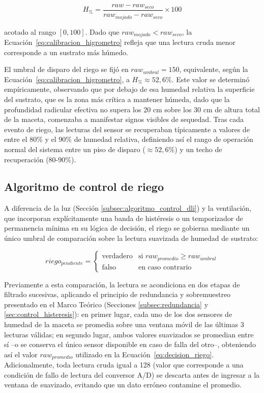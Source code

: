 \begin{equation}
    H_{\%} = \frac{raw - raw_{seco}}{raw_{mojado} - raw_{seco}} \times 100
    \label{eq:calibracion_higrometro}
\end{equation}

acotado al rango $[0, 100]$. Dado que $raw_{mojado} < raw_{seco}$, la Ecuación~\ref{eq:calibracion_higrometro} refleja que una lectura cruda menor corresponde a un sustrato más húmedo.

El umbral de disparo del riego se fijó en $raw_{umbral} = 150$, equivalente, según la Ecuación~\ref{eq:calibracion_higrometro}, a $H_{\%} \approx 52{,}6\%$. Este valor se determinó empíricamente, observando que por debajo de esa humedad relativa la superficie del sustrato, que es la zona más crítica a mantener húmeda, dado que la profundidad radicular efectiva no supera los 20 cm sobre los 30 cm de altura total de la maceta, comenzaba a manifestar signos visibles de sequedad. Tras cada evento de riego, las lecturas del sensor se recuperaban típicamente a valores de entre el 80\% y el 90\% de humedad relativa, definiendo así el rango de operación normal del sistema entre un piso de disparo ($\approx 52{,}6\%$) y un techo de recuperación ($80\text{-}90\%$).

\subsection{Algoritmo de control de riego}
\label{subsec:algoritmo_control_riego}

A diferencia de la luz (Sección \ref{subsec:algoritmo_control_dli}) y la ventilación, que incorporan explícitamente una banda de histéresis o un temporizador de permanencia mínima en su lógica de decisión, el riego se gobierna mediante un único umbral de comparación sobre la lectura suavizada de humedad de sustrato:

\begin{equation}
    riego_{pendiente} =
    \begin{cases}
        \text{verdadero} & \text{si } raw_{promedio} \geq raw_{umbral} \\
        \text{falso} & \text{en caso contrario}
    \end{cases}
    \label{eq:decision_riego}
\end{equation}

Previamente a esta comparación, la lectura se acondiciona en dos etapas de filtrado sucesivas, aplicando el principio de redundancia y sobremuestreo presentado en el Marco Teórico (Secciones \ref{subsec:redundancia} y \ref{sec:control_histeresis}): en primer lugar, cada uno de los dos sensores de humedad de la maceta se promedia sobre una ventana móvil de las últimas 3 lecturas válidas; en segundo lugar, ambos valores suavizados se promedian entre sí --o se conserva el único sensor disponible en caso de falla del otro--, obteniendo así el valor $raw_{promedio}$ utilizado en la Ecuación~\ref{eq:decision_riego}. Adicionalmente, toda lectura cruda igual a 128 (valor que corresponde a una condición de fallo de lectura del conversor A/D) se descarta antes de ingresar a la ventana de suavizado, evitando que un dato erróneo contamine el promedio.

